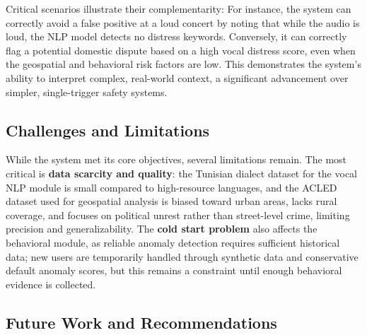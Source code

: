 \documentclass[12pt,a4paper,oneside,english]{book}
\begin{document}
{Critical scenarios illustrate their complementarity: For instance, the system can correctly avoid a false positive at a loud concert by noting that while the audio is loud, the NLP model detects 
no distress keywords. Conversely, it can correctly flag a potential domestic dispute based on a high vocal distress score, even when the geospatial and behavioral risk factors are low. 
This demonstrates the system's ability to interpret complex, real-world context, a significant advancement over simpler, single-trigger safety systems.

    \subsection{Challenges and Limitations}
    \label{subsec:challenges}
While the system met its core objectives, several limitations remain. The most critical is \textbf{data scarcity and quality}: the Tunisian dialect dataset for the vocal NLP module is small compared to high-resource languages, and the ACLED dataset used for geospatial analysis is biased toward urban areas, lacks rural coverage, and focuses on political unrest rather than street-level crime, limiting precision and generalizability. The \textbf{cold start problem} also affects the behavioral module, as reliable anomaly detection requires sufficient historical data; new users are temporarily handled through synthetic data and conservative default anomaly scores, but this remains a constraint until enough behavioral evidence is collected.


    \subsection{Future Work and Recommendations}
    \label{subsec:future_work}

}
\end{document}

